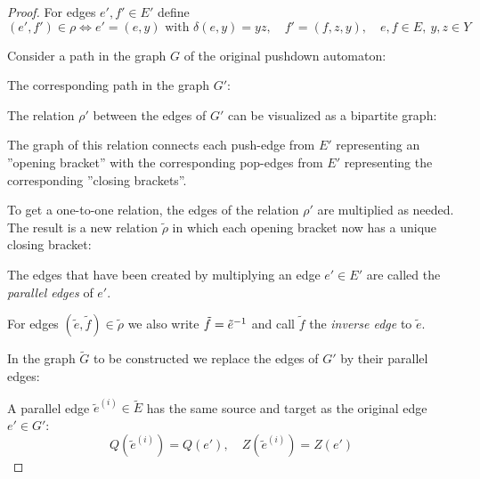 \begin{proof}
For edges $e', f' \in E'$ define
\[ (e', f') \in \rho \iff e' = (e, y)\text{ with }\delta(e, y) = y z,\quad
f' = (f, z, y),\quad e, f \in E,\ y,z \in Y \]

Consider a path in the graph $G$ of the original pushdown automaton:

\begin{center}

\end{center}

The corresponding path in the graph $G'$:

\begin{center}

\end{center}

The relation $\rho'$ between the edges of $G'$ can be visualized as a bipartite
graph:

\begin{center}

\end{center}

The graph of this relation connects each push-edge from $E'$ representing an 
''opening bracket'' with the corresponding pop-edges from $E'$ representing the
corresponding ''closing brackets''.

To get a one-to-one relation, the edges of the relation $\rho'$ are multiplied
as needed. The result is a new relation $\tilde{\rho}$ in which each
opening bracket now has a unique closing bracket:

\begin{center}

\end{center}

The edges that have been created by multiplying an edge $e' \in E'$ are called
the {\em parallel edges} of $e'$.

For edges $(\tilde{e}, \tilde f) \in \tilde{\rho}$ we also write $\tilde f =
\mbox{${\tilde e}^{-1}$}$ and call $\tilde f$ the {\em inverse edge} to $\tilde e$.

In the graph $\tilde{G}$ to be constructed we replace the edges of $G'$ by their
parallel edges:

\begin{center}

\end{center}

A parallel edge $\tilde{e}^{(i)} \in \tilde E$ has the same source and target as
the original edge $e' \in G'$:
\[ Q(\tilde{e}^{(i)}) = Q(e'),\quad Z(\tilde{e}^{(i)}) = Z(e') \]


\end{proof}
